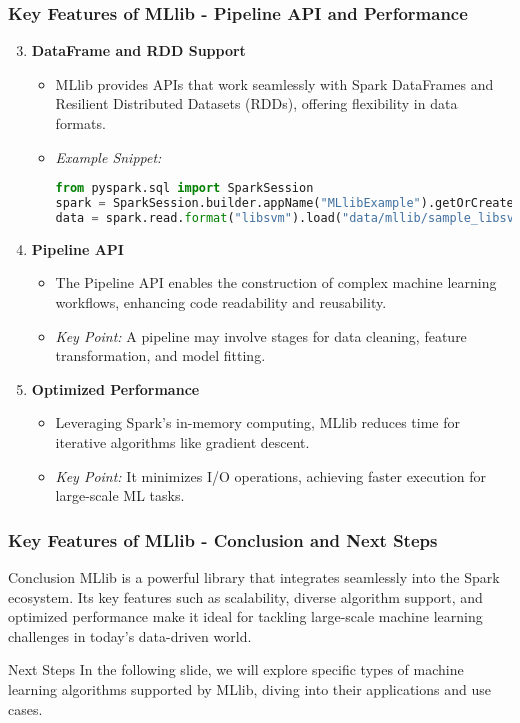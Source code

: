 \documentclass[aspectratio=169]{beamer}
\begin{document}
\begin{frame}[fragile]
    \frametitle{Key Features of MLlib - Pipeline API and Performance}
    \begin{enumerate}
        \setcounter{enumi}{2}  %
        \item \textbf{DataFrame and RDD Support}
        \begin{itemize}
            \item MLlib provides APIs that work seamlessly with Spark DataFrames and Resilient Distributed Datasets (RDDs), offering flexibility in data formats.
            \item \textit{Example Snippet:}
            \begin{lstlisting}[language=python]
from pyspark.sql import SparkSession
spark = SparkSession.builder.appName("MLlibExample").getOrCreate()
data = spark.read.format("libsvm").load("data/mllib/sample_libsvm_data.txt")
            \end{lstlisting}
        \end{itemize}

        \item \textbf{Pipeline API}
        \begin{itemize}
            \item The Pipeline API enables the construction of complex machine learning workflows, enhancing code readability and reusability.
            \item \textit{Key Point:} A pipeline may involve stages for data cleaning, feature transformation, and model fitting.
        \end{itemize}

        \item \textbf{Optimized Performance}
        \begin{itemize}
            \item Leveraging Spark’s in-memory computing, MLlib reduces time for iterative algorithms like gradient descent.
            \item \textit{Key Point:} It minimizes I/O operations, achieving faster execution for large-scale ML tasks.
        \end{itemize}
    \end{enumerate}
\end{frame}

\begin{frame}[fragile]
    \frametitle{Key Features of MLlib - Conclusion and Next Steps}
    \begin{block}{Conclusion}
        MLlib is a powerful library that integrates seamlessly into the Spark ecosystem. Its key features such as scalability, diverse algorithm support, and optimized performance make it ideal for tackling large-scale machine learning challenges in today's data-driven world.
    \end{block}

    \begin{block}{Next Steps}
        In the following slide, we will explore specific types of machine learning algorithms supported by MLlib, diving into their applications and use cases.
    \end{block}
\end{frame}
\end{document}
